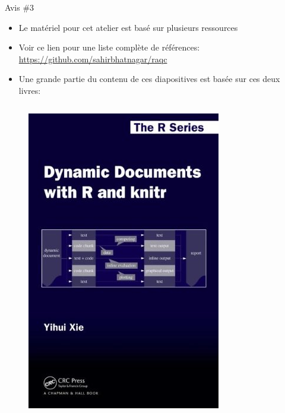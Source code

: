 \documentclass[10pt]{beamer}\usepackage[]{graphicx}\usepackage[]{color}
\begin{document}
\begin{frame}{Avis \#3}

\begin{itemize}
\item Le mat\'{e}riel pour cet atelier est bas\'{e} sur plusieurs ressources 
\item Voir ce lien pour une liste compl\`{e}te de r\'{e}f\'{e}rences: \href{https://github.com/sahirbhatnagar/raqc}{https://github.com/sahirbhatnagar/raqc}
\item Une grande partie du contenu de ces diapositives est basée sur ces deux livres:
\end{itemize}

\begin{columns}[c] %
\begin{figure}
\includegraphics[width=0.6\columnwidth]{yihui.png}
\end{figure}


\end{columns}
\end{frame}
\end{document}
